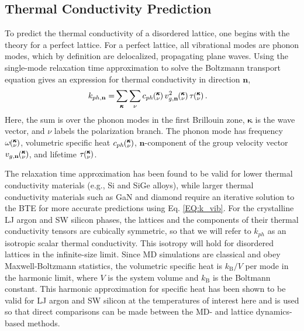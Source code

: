 \subsection{\label{S:Thermal Theory}
Thermal Conductivity Prediction}

To predict the thermal conductivity of a disordered lattice, 
one begins with the theory for a perfect lattice. For a perfect lattice, 
all vibrational modes are phonon modes, which by 
definition are delocalized, propagating plane waves.
\cite{ziman_electrons_2001} Using the single-mode relaxation
time approximation \cite{ziman_electrons_2001} to solve 
the Boltzmann transport equation gives an 
expression for thermal conductivity in direction $\mathbf{n}$,
\begin{equation}\label{EQ:k_vib}
\begin{split}
k_{ph,\mathbf{n}}=&\sum_{\pmb{\kappa}} \sum_\nu c_{ph}\kv 
v^{2}_{g,\mathbf{n}}\kv \tau\kv.
\end{split}
\end{equation}
Here, the sum is over the phonon modes in the first Brillouin 
zone, $\pmb{\kappa}$ is the wave vector, and 
$\nu$ labels the polarization branch.  
The phonon mode has frequency $\omega\mspace{-4.0mu}\left(\mspace{-8.0mu} \begin{smallmatrix}&\pmb{\kappa} \\&\nu\end{smallmatrix} \mspace{-3.0mu}\right)$, 
volumetric specific heat $c_{ph}\mspace{-4.0mu}\left(\mspace{-8.0mu} \begin{smallmatrix}&\pmb{\kappa} \\&\nu\end{smallmatrix} \mspace{-3.0mu}\right)$, 
$\mathbf{n}$-component of the 
group velocity vector ${v}_{g,\mathbf{n}}\mspace{-4.0mu}\left(\mspace{-8.0mu} \begin{smallmatrix}&\pmb{\kappa} \\&\nu\end{smallmatrix} \mspace{-3.0mu}\right)$, 
and lifetime $\tau\mspace{-4.0mu}\left(\mspace{-8.0mu} \begin{smallmatrix}&\pmb{\kappa} \\&\nu\end{smallmatrix} \mspace{-3.0mu}\right)$. 

The relaxation time approximation has been found to be valid  
for lower thermal conductivity materials 
(e.g., Si and SiGe alloys),
\cite{broido_intrinsic_2007,ward_intrinsic_2010,garg_role_2011} 
while larger thermal conductivity 
materials such as GaN and diamond require an  
iterative solution to the BTE for more accurate predictions 
using Eq. \eqref{EQ:k_vib}.
\cite{ward_ab_2009,lindsay_thermal_2012} 
For the crystalline LJ argon and SW silicon phases, 
the lattices and the components of their 
thermal conductivity tensors are cubically symmetric, 
so that we will refer to 
$k_{ph}$ as an isotropic scalar thermal conductivity. 
This isotropy will hold for disordered lattices 
in the infinite-size limit. 
Since MD simulations are classical 
and obey Maxwell-Boltzmann 
statistics,\cite{mcquarrie_statistical_2000} the volumetric 
specific heat is $k_{\text{B}}/V$ per mode in the harmonic limit, where $V$ 
is the system volume and $k_{\text{B}}$ is the Boltmann constant. 
This harmonic approximation for specific heat has been shown to be valid 
for LJ argon and SW silicon at the temperatures of interest here
\cite{mcgaughey_quantitative_2004,goicochea_thermal_2010} 
and is used so that direct comparisons can be made between 
the MD- and lattice dynamics-based methods.

